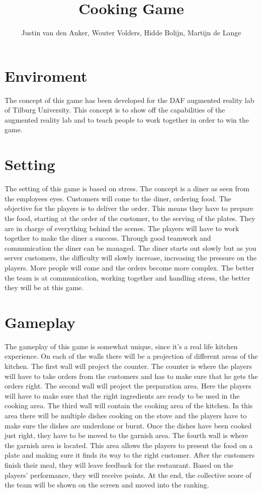 \documentclass[10pt,a4paper]{article}
\author{Justin van den Anker, Wouter Volders, Hidde Bolijn, Martijn de Lange}
\title{Cooking Game}
\begin{document}
\maketitle

\section{Enviroment}
The concept of this game has been developed for the DAF augmented reality lab of Tilburg University. This concept is to show off the capabilities of the augmented reality lab and to teach people to work together in order to win the game.

\section{Setting}
The setting of this game is based on stress. The concept is a diner as seen from the employees eyes. Customers will come to the diner, ordering food. The objective for the players is to deliver the order. This means they have to prepare the food, starting at the order of the customer, to the serving of the plates. They are in charge of everything behind the scenes. The players will have to work together to make the diner a success. Through good teamwork and communication the diner can be managed. The diner starts out slowly but as you server customers, the difficulty will slowly increase, increasing the pressure on the players. More people will come and the orders become more complex. The better the team is at communication, working together and handling stress, the better they will be at this game.

\section{Gameplay}
The gameplay of this game is somewhat unique, since it's a real life kitchen experience. On each of the walls there will be a projection of different areas of the kitchen. The first wall will project the counter. The counter is where the players will have to take orders from the customers and has to make sure that he gets the orders right. The second wall will project the preparation area. Here the players will have to make sure that the right ingredients are ready to be used in the cooking area. The third wall will contain the cooking area of the kitchen. In this area there will be multiple dishes cooking on the stove and the players have to make sure the dishes are underdone or burnt. Once the dishes have been cooked just right, they have to be moved to the garnish area. The fourth wall is where the garnish area is located. This area allows the players to present the food on a plate and making sure it finds its way to the right customer. After the customers finish their meal, they will leave feedback for the restaurant. Based on the players' performance, they will receive points. At the end, the collective score of the team will be shown on the screen and moved into the ranking.
\end{document}
